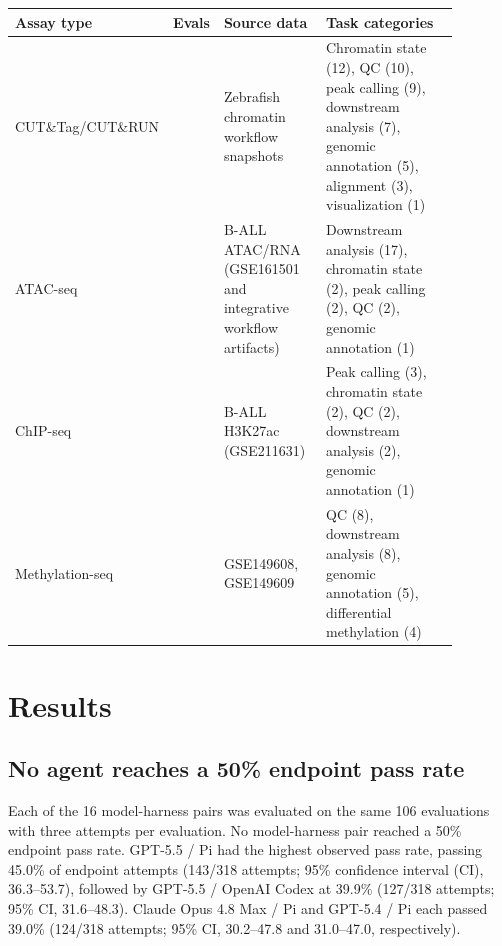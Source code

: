 \documentclass[10pt,letterpaper]{article}
\begin{document}
\begin{center}
\fontsize{7.2}{8.7}\selectfont
\setlength{\tabcolsep}{3.2pt}
\begin{tabular}{@{}>{\raggedright\arraybackslash}p{0.16\linewidth}
                >{\centering\arraybackslash}p{0.055\linewidth}
                >{\raggedright\arraybackslash}p{0.25\linewidth}
                >{\raggedright\arraybackslash}p{0.42\linewidth}@{}}
\toprule
Assay type & Evals & Source data & Task categories \\
\midrule
CUT\&Tag/CUT\&RUN &
47 &
Zebrafish chromatin workflow snapshots &
Chromatin state (12), QC (10), peak calling (9), downstream analysis (7), genomic annotation (5), alignment (3), visualization (1) \\
\addlinespace
ATAC-seq &
24 &
B-ALL ATAC/RNA (GSE161501 and integrative workflow artifacts) &
Downstream analysis (17), chromatin state (2), peak calling (2), QC (2), genomic annotation (1) \\
\addlinespace
ChIP-seq &
10 &
B-ALL H3K27ac (GSE211631) &
Peak calling (3), chromatin state (2), QC (2), downstream analysis (2), genomic annotation (1) \\
\addlinespace
Methylation-seq &
25 &
GSE149608, GSE149609 &
QC (8), downstream analysis (8), genomic annotation (5), differential methylation (4) \\
\bottomrule
\end{tabular}
\label{tab:evaluation-inventory}
\end{center}

\clearpage

\StartBody

\section{Results}

\subsection{No agent reaches a 50\% endpoint pass rate}

Each of the 16 model-harness pairs was evaluated on the same 106 evaluations
with three attempts per evaluation. No model-harness pair reached a 50\%
endpoint pass rate. GPT-5.5 / Pi had the highest observed pass rate, passing
45.0\% of endpoint attempts (143/318 attempts; 95\% confidence interval (CI),
36.3--53.7), followed by GPT-5.5 / OpenAI Codex at 39.9\% (127/318 attempts;
95\% CI, 31.6--48.3). Claude Opus 4.8 Max / Pi and GPT-5.4 / Pi each passed
39.0\% (124/318 attempts; 95\% CI, 30.2--47.8 and 31.0--47.0, respectively).
\end{document}
